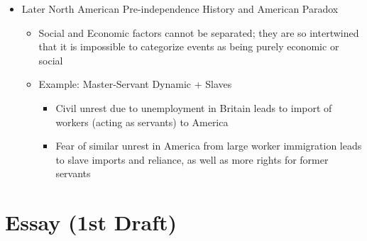 \documentclass[letterpaper]{article}
\begin{document}
\begin{itemize}
\item Later North American Pre-independence History and American Paradox

\begin{itemize}
\item Social and Economic factors cannot be separated; they are so
intertwined that it is impossible to categorize events as being
purely economic or social
\item Example: Master-Servant Dynamic + Slaves

\begin{itemize}
\item Civil unrest due to unemployment in Britain leads to import of
workers (acting as servants) to America
\item Fear of similar unrest in America from large worker immigration
leads to slave imports and reliance, as well as more rights for
former servants
\end{itemize}
\end{itemize}
\end{itemize}

\section{Essay (1st Draft)}
\label{sec:org131a3b9}
\end{document}
